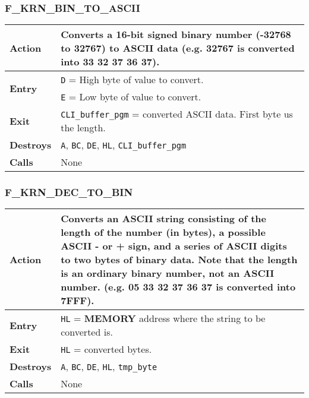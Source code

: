     \subsubsection{F\_KRN\_BIN\_TO\_ASCII}
    \label{func:fkrnbintoascii}
    \begin{tabular}{l p{15cm}}
        \hline\textbf{Action}
        & Converts a 16-bit signed binary number (-32768 to 32767) to ASCII
        data (e.g. 32767 is converted into 33 32 37 36 37).\\
        \hline\multirow[t]{2}{4em}{\textbf{Entry}}
        & \texttt{D} = High byte of value to convert.\\
        & \texttt{E} = Low byte of value to convert.\\
        \hline\textbf{Exit} & \texttt{CLI\_buffer\_pgm} = converted ASCII data.
        First byte us the length.\\
        \hline\textbf{Destroys} & \texttt{A}, \texttt{BC}, \texttt{DE}, 
        \texttt{HL}, \texttt{CLI\_buffer\_pgm}\\
        \hline\textbf{Calls} & None\\
        \hline
    \end{tabular}

    \subsubsection{F\_KRN\_DEC\_TO\_BIN}
    \label{func:fkrndectobin}
    \begin{tabular}{l p{15cm}}
        \hline\textbf{Action}
        & Converts an ASCII string consisting of the length of the number
        (in bytes), a possible ASCII - or + sign, and a series of ASCII
        digits to two bytes of binary data. Note that the length is an
        ordinary binary number, not an ASCII number. (e.g. 05 33 32 37 36 37
        is converted into 7FFF).\\
        \hline\textbf{Entry} & \texttt{HL} = \textbf{MEMORY} address where
        the string to be converted is.\\
        \hline\textbf{Exit} & \texttt{HL} = converted bytes.\\
        \hline\textbf{Destroys} & \texttt{A}, \texttt{BC}, \texttt{DE}, 
        \texttt{HL}, \texttt{tmp\_byte}\\
        \hline\textbf{Calls} & None\\
        \hline
    \end{tabular}

